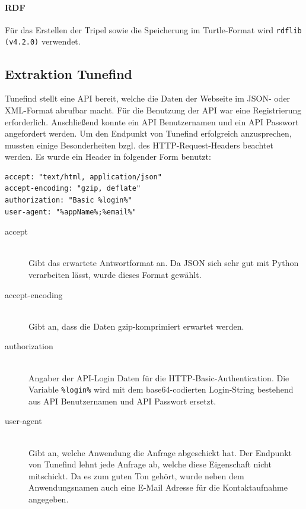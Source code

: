 \documentclass[parskip]{scrartcl}
\begin{document}
\paragraph{RDF}
Für das Erstellen der Tripel sowie die Speicherung im Turtle-Format wird \texttt{rdflib (v4.2.0)} verwendet. 

\subsection{Extraktion Tunefind}

Tunefind stellt eine API bereit, welche die Daten der Webseite im JSON- oder XML-Format abrufbar macht. Für die Benutzung der API war eine Registrierung erforderlich. Anschließend konnte ein API Benutzernamen und ein API Passwort angefordert werden.
Um den Endpunkt von Tunefind erfolgreich anzusprechen, mussten einige Besonderheiten bzgl. des HTTP-Request-Headers beachtet werden. Es wurde ein Header in folgender Form benutzt:

\begin{lstlisting}[caption={HTTP-Request-Header}, label={list:httpHeader}]
accept: "text/html, application/json"
accept-encoding: "gzip, deflate"
authorization: "Basic %login%"
user-agent: "%appName%;%email%"
\end{lstlisting}

\begin{description}
    \item[accept] \hfill \\
        Gibt das erwartete Antwortformat an. Da JSON sich sehr gut mit Python verarbeiten lässt, wurde dieses Format gewählt.
    \item[accept-encoding] \hfill \\
        Gibt an, dass die Daten gzip-komprimiert erwartet werden.
    \item[authorization] \hfill \\
        Angaber der API-Login Daten für die HTTP-Basic-Authentication.
        Die Variable \texttt{\%login\%} wird mit dem base64-codierten Login-String bestehend aus API Benutzernamen und API Passwort ersetzt.
    \item[user-agent] \hfill \\
        Gibt an, welche Anwendung die Anfrage abgeschickt hat. Der Endpunkt von Tunefind lehnt jede Anfrage ab, welche diese Eigenschaft nicht mitschickt. Da es zum guten Ton gehört, wurde neben dem Anwendungsnamen auch eine E-Mail Adresse für die Kontaktaufnahme angegeben. 

\end{description}
\end{document}
